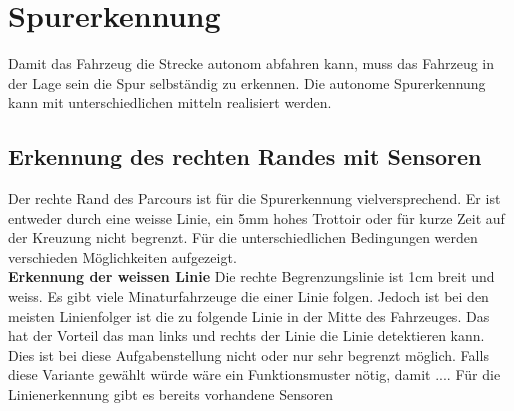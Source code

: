 \section{Spurerkennung}
Damit das Fahrzeug die Strecke autonom abfahren kann, muss das Fahrzeug in der Lage sein die Spur selbständig zu erkennen.
Die autonome Spurerkennung kann mit unterschiedlichen mitteln realisiert werden.

\subsection{Erkennung des rechten Randes mit Sensoren}
Der rechte Rand des Parcours ist für die Spurerkennung vielversprechend. Er ist entweder durch eine weisse Linie, ein 5mm hohes Trottoir oder für kurze Zeit auf der Kreuzung nicht begrenzt.
Für die unterschiedlichen Bedingungen werden verschieden Möglichkeiten aufgezeigt.\\

\textbf {Erkennung der weissen Linie}
Die rechte Begrenzungslinie ist 1cm breit und weiss. Es gibt viele Minaturfahrzeuge die einer Linie folgen. Jedoch ist bei den meisten Linienfolger ist die zu folgende Linie in der Mitte des Fahrzeuges. Das hat der Vorteil das man links und rechts der Linie die Linie detektieren kann. Dies ist bei diese Aufgabenstellung nicht oder nur sehr begrenzt möglich. Falls diese Variante gewählt würde wäre ein Funktionsmuster nötig, damit ....
Für die Linienerkennung gibt es bereits vorhandene Sensoren